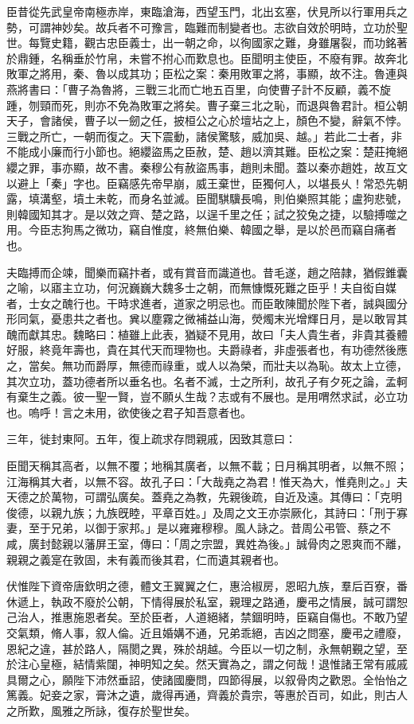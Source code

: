 \begin{pinyinscope}
臣昔從先武皇帝南極赤岸，東臨滄海，西望玉門，北出玄塞，伏見所以行軍用兵之勢，可謂神妙矣。故兵者不可豫言，臨難而制變者也。志欲自效於明時，立功於聖世。每覽史籍，觀古忠臣義士，出一朝之命，以徇國家之難，身雖屠裂，而功銘著於鼎鍾，名稱垂於竹帛，未嘗不拊心而歎息也。臣聞明主使臣，不廢有罪。故奔北敗軍之將用，秦、魯以成其功；臣松之案：秦用敗軍之將，事顯，故不注。魯連與燕將書曰：「曹子為魯將，三戰三北而亡地五百里，向使曹子計不反顧，義不旋踵，刎頸而死，則亦不免為敗軍之將矣。曹子棄三北之恥，而退與魯君計。桓公朝天子，會諸侯，曹子以一劒之任，披桓公之心於壇坫之上，顏色不變，辭氣不悖。三戰之所亡，一朝而復之。天下震動，諸侯驚駭，威加吳、越。」若此二士者，非不能成小廉而行小節也。絕纓盜馬之臣赦，楚、趙以濟其難。臣松之案：楚莊掩絕纓之罪，事亦顯，故不書。秦穆公有赦盜馬事，趙則未聞。蓋以秦亦趙姓，故互文以避上「秦」字也。臣竊感先帝早崩，威王棄世，臣獨何人，以堪長乆！常恐先朝露，填溝壑，墳土未乾，而身名並滅。臣聞騏驥長鳴，則伯樂照其能；盧狗悲號，則韓國知其才。是以效之齊、楚之路，以逞千里之任；試之狡兔之捷，以驗搏噬之用。今臣志狗馬之微功，竊自惟度，終無伯樂、韓國之舉，是以於邑而竊自痛者也。

夫臨搏而企竦，聞樂而竊抃者，或有賞音而識道也。昔毛遂，趙之陪隷，猶假錐囊之喻，以寤主立功，何況巍巍大魏多士之朝，而無慷慨死難之臣乎！夫自衒自媒者，士女之醜行也。干時求進者，道家之明忌也。而臣敢陳聞於陛下者，誠與國分形同氣，憂患共之者也。兾以塵霧之微補益山海，熒燭末光增輝日月，是以敢冐其醜而獻其忠。魏略曰：植雖上此表，猶疑不見用，故曰「夫人貴生者，非貴其養體好服，終竟年壽也，貴在其代天而理物也。夫爵祿者，非虛張者也，有功德然後應之，當矣。無功而爵厚，無德而祿重，或人以為榮，而壯夫以為恥。故太上立德，其次立功，蓋功德者所以垂名也。名者不滅，士之所利，故孔子有夕死之論，孟軻有棄生之義。彼一聖一賢，豈不願乆生哉？志或有不展也。是用喟然求試，必立功也。嗚呼！言之未用，欲使後之君子知吾意者也。

三年，徙封東阿。五年，復上疏求存問親戚，因致其意曰：

臣聞天稱其高者，以無不覆；地稱其廣者，以無不載；日月稱其明者，以無不照；江海稱其大者，以無不容。故孔子曰：「大哉堯之為君！惟天為大，惟堯則之。」夫天德之於萬物，可謂弘廣矣。蓋堯之為教，先親後疏，自近及遠。其傳曰：「克明俊德，以親九族；九族旣睦，平章百姓。」及周之文王亦崇厥化，其詩曰：「刑于寡妻，至于兄弟，以御于家邦。」是以雍雍穆穆。風人詠之。昔周公弔管、蔡之不咸，廣封懿親以藩屏王室，傳曰：「周之宗盟，異姓為後。」誠骨肉之恩爽而不離，親親之義寔在敦固，未有義而後其君，仁而遺其親者也。

伏惟陛下資帝唐欽明之德，體文王翼翼之仁，惠洽椒房，恩昭九族，羣后百寮，番休遞上，執政不廢於公朝，下情得展於私室，親理之路通，慶弔之情展，誠可謂恕己治人，推惠施恩者矣。至於臣者，人道絕緒，禁錮明時，臣竊自傷也。不敢乃望交氣類，脩人事，叙人倫。近且婚媾不通，兄弟乖絕，吉凶之問塞，慶弔之禮廢，恩紀之違，甚於路人，隔閡之異，殊於胡越。今臣以一切之制，永無朝覲之望，至於注心皇極，結情紫闥，神明知之矣。然天實為之，謂之何哉！退惟諸王常有戚戚具爾之心，願陛下沛然垂詔，使諸國慶問，四節得展，以叙骨肉之歡恩。全怡怡之篤義。妃妾之家，膏沐之遺，歲得再通，齊義於貴宗，等惠於百司，如此，則古人之所歎，風雅之所詠，復存於聖世矣。


\end{pinyinscope}
